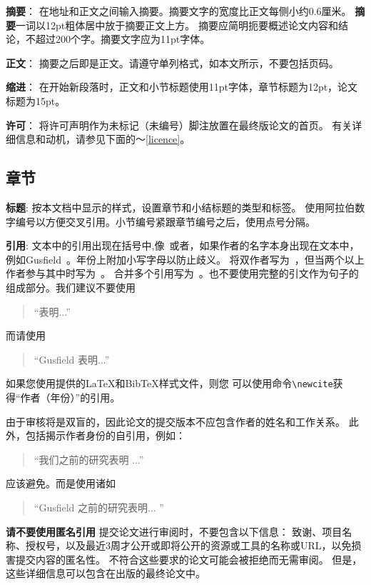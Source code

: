 \documentclass[11pt]{article}
\begin{document}
\begin{CJK*}{UTF8}{gbsn}
{\bf 摘要}：
在地址和正文之间输入摘要。摘要文字的宽度比正文每侧小约0.6厘米。
{\bf 摘要}一词以12pt粗体居中放于摘要正文上方。
摘要应简明扼要概述论文内容和结论，不超过200个字。摘要文字应为11pt字体。

{\bf 正文}：
摘要之后即是正文。请遵守单列格式，如本文所示，不要包括页码。

{\bf 缩进}：
在开始新段落时，正文和小节标题使用11pt字体，章节标题为12pt，论文标题为15pt。

{\bf 许可}：
将许可声明作为未标记（未编号）脚注放置在最终版论文的首页。
有关详细信息和动机，请参见下面的〜\ref{licence}。

\subsection{章节}

{\bf 标题}:
按本文档中显示的样式，设置章节和小结标题的类型和标签。
使用阿拉伯数字编号以方便交叉引用。小节编号紧跟章节编号之后，使用点号分隔。


{\bf 引用}:
文本中的引用出现在括号中,像~\cite{Gusfield:97}或者，如果作者的名字本身出现在文本中，例如Gusfield~。年份上附加小写字母以防止歧义。
将双作者写为~\cite{Aho:72}，但当两个以上作者参与其中时写为~\cite{Chandra:81}。
合并多个引用写为~\cite{Gusfield:97,Aho:72}。也不要使用完整的引文作为句子的组成部分。我们建议不要使用
\begin{quote}
  ``\cite{Gusfield:97}表明...''
\end{quote}
而请使用
\begin{quote}
``Gusfield 表明...''
\end{quote}
如果您使用提供的\LaTeX{}和Bib\TeX{}样式文件，则您
可以使用命令\verb|\newcite|获得“作者（年份）”的引用。

由于审核将是双盲的，因此论文的提交版本不应包含作者的姓名和工作关系。
此外，包括揭示作者身份的自引用，例如：
\begin{quote}
``我们之前的研究表明\cite{Gusfield:97} ...''
\end{quote}
应该避免。而是使用诸如
\begin{quote}
``Gusfield 
之前的研究表明... ''
\end{quote}

\textbf{请不要使用匿名引用}
提交论文进行审阅时，不要包含以下信息：
致谢、项目名称、授权号，以及最近3周才公开或即将公开的资源或工具的名称或URL，以免损害提交内容的匿名性。
不符合这些要求的论文可能会被拒绝而无需审阅。
但是，这些详细信息可以包含在出版的最终论文中。


\end{CJK*}
\end{document}
